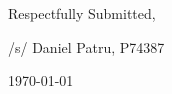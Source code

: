 \documentclass[12pt,\documentclassflag]{michiganCourtOfAppealsBrief}
\begin{document}


\vspace{1\baselineskip}

{ \setlength{\leftskip}{3.5in}
  Respectfully Submitted,

  /s/ Daniel Patru, P74387

\today

  \setlength{\leftskip}{0pt}}


\newpage\empty%
\end{document}
